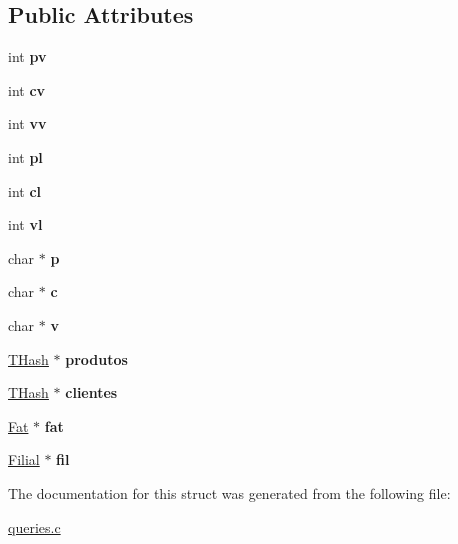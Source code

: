 \subsection*{Public Attributes}
\begin{DoxyCompactItemize}
\item 
\mbox{\label{structsgv_a4b8d7e6a972ec2f21671b3ab155d132a}} 
int {\bfseries pv}
\item 
\mbox{\label{structsgv_a36bc956c45e586a9b9056deeb1749a6b}} 
int {\bfseries cv}
\item 
\mbox{\label{structsgv_a2d080a4c47b473d8747e89c18735d8f3}} 
int {\bfseries vv}
\item 
\mbox{\label{structsgv_a02e1e045823a4dc3c1ab1ece027a5b4a}} 
int {\bfseries pl}
\item 
\mbox{\label{structsgv_adac44502afdca954fd3b57b829e2b049}} 
int {\bfseries cl}
\item 
\mbox{\label{structsgv_ad95470ebda9ad32f6dbecaa30ea14cd5}} 
int {\bfseries vl}
\item 
\mbox{\label{structsgv_a317521860330be926e28125e899c58ea}} 
char $\ast$ {\bfseries p}
\item 
\mbox{\label{structsgv_a82cc554aef081b2f7503dc5566fbf04e}} 
char $\ast$ {\bfseries c}
\item 
\mbox{\label{structsgv_afe9a282ca6b9d987c53776d4e929e947}} 
char $\ast$ {\bfseries v}
\item 
\mbox{\label{structsgv_a47f0cef78e0698ee4ece6c6258bb34d8}} 
\hyperlink{structthash}{T\+Hash} $\ast$ {\bfseries produtos}
\item 
\mbox{\label{structsgv_af18caa4720ba06601ff5e040ed8617a3}} 
\hyperlink{structthash}{T\+Hash} $\ast$ {\bfseries clientes}
\item 
\mbox{\label{structsgv_a33a097883450d211c75b3c2c98b658eb}} 
\hyperlink{structfat}{Fat} $\ast$ {\bfseries fat}
\item 
\mbox{\label{structsgv_aa600935a1125d376845c0368238bf0b1}} 
\hyperlink{structfilial}{Filial} $\ast$ {\bfseries fil}
\end{DoxyCompactItemize}


The documentation for this struct was generated from the following file\+:\begin{DoxyCompactItemize}
\item 
\hyperlink{queries_8c}{queries.\+c}\end{DoxyCompactItemize}

